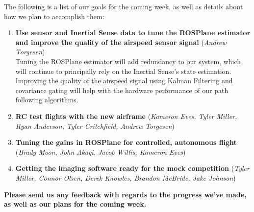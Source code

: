 \documentclass[]{../auvsi_doc}
\begin{document}
The following is a list of our goals for the coming week, as well as details about how we plan to accomplish them:

\begin{enumerate}
	\item \textbf{Use sensor and Inertial Sense data to tune the ROSPlane estimator and improve the quality of the airspeed sensor signal} (\textit{Andrew Torgesen}) \\
	Tuning the ROSPlane estimator will add redundancy to our system, which will continue to principally rely on the Inertial Sense's state estimation. Improving the quality of the airspeed signal using Kalman Filtering and covariance gating will help with the hardware performance of our path following algorithms.
	\item \textbf{RC test flights with the new airframe} (\textit{Kameron Eves, Tyler Miller, Ryan Anderson, Tyler Critchfield, Andrew Torgesen})
	\item \textbf{Tuning the gains in ROSPlane for controlled, autonomous flight} (\textit{Brady Moon, John Akagi, Jacob Willis, Kameron Eves})
	\item \textbf{Getting the imaging software ready for the mock competition} (\textit{Tyler Miller, Connor Olsen, Derek Knowles, Brandon McBride, Jake Johnson})
\end{enumerate}

\textbf{Please send us any feedback with regards to the progress we've made, as well as our plans for the coming week.}

%
%
%
\end{document}
